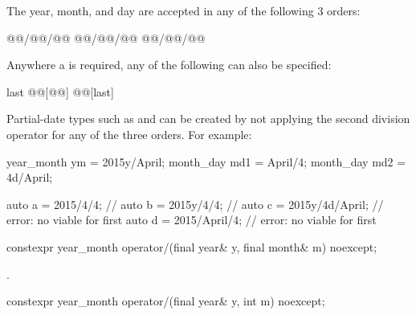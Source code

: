 \pnum
\begin{note}
The year, month, and day are accepted in any of the following 3 orders:

\begin{codeblock}
@@/@@/@@
@@/@@/@@
@@/@@/@@
\end{codeblock}

Anywhere a  is required, any of the following can also be specified:

\begin{codeblock}
last
@@[@@]
@@[last]
\end{codeblock}
\end{note}

\pnum
\begin{note}
Partial-date types such as  and 
can be created by not applying the second division operator
for any of the three orders. For example:

\begin{codeblock}
year_month ym = 2015y/April;
month_day md1 = April/4;
month_day md2 = 4d/April;
\end{codeblock}
\end{note}

\pnum
\begin{example}
\begin{codeblock}
auto a = 2015/4/4;         // 
auto b = 2015y/4/4;        // 
auto c = 2015y/4d/April;   // error: no viable  for first \tcode{/}
auto d = 2015/April/4;     // error: no viable  for first \tcode{/}
\end{codeblock}
\end{example}

\begin{itemdecl}
constexpr year_month
  operator/(final year& y, final month& m) noexcept;
\end{itemdecl}

\begin{itemdescr}
\pnum
\returns {}.
\end{itemdescr}

\begin{itemdecl}
constexpr year_month
  operator/(final year& y, int   m) noexcept;
\end{itemdecl}

